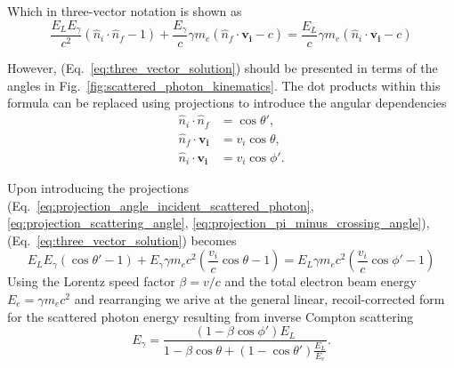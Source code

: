 \documentclass[../main.tex]{subfiles}
\begin{document}
Which in three-vector notation is shown as
\begin{equation}
\frac{E_{L}E_{\gamma}}{c^{2}}\left(\hat{n}_{i}\cdot\hat{n}_{f}-1\right)+\frac{E_{\gamma}}{c}\gamma m_{e}\left(\hat{n}_{f}\cdot \boldsymbol{v_{i}}-c\right) = \frac{E_{L}}{c}\gamma m_{e}\left(\hat{n}_{i}\cdot \boldsymbol{v_{i}} -c\right)
\label{eq:three_vector_solution}
\end{equation}

However, (Eq.~\ref{eq:three_vector_solution}) should be presented in terms of the angles in Fig.~\ref{fig:scattered_photon_kinematics}. The dot products within this formula can be replaced using projections to introduce the angular dependencies
\begin{align}
\hat{n}_{i}\cdot\hat{n}_{f} &= \cos\theta',
\label{eq:projection_angle_incident_scattered_photon}\\
\hat{n}_{f}\cdot \boldsymbol{v_{i}} &= v_{i}\cos\theta,
\label{eq:projection_scattering_angle}\\
\hat{n}_{i}\cdot \boldsymbol{v_{i}} &= v_{i}\cos\phi'.
\label{eq:projection_pi_minus_crossing_angle}
\end{align}

Upon introducing the projections (Eq.~\ref{eq:projection_angle_incident_scattered_photon}, \ref{eq:projection_scattering_angle}, \ref{eq:projection_pi_minus_crossing_angle}), (Eq.~\ref{eq:three_vector_solution}) becomes
\begin{equation}
E_{L}E_{\gamma}\left(\cos\theta'-1\right)+E_{\gamma}\gamma m_{e}c^{2}\left(\frac{v_{i}}{c}\cos\theta-1\right) = E_{L}\gamma m_{e}c^{2}\left( \frac{v_{i}}{c}\cos\phi'-1\right)
\label{eq:three_vector_solution_projections}
\end{equation}
Using the Lorentz speed factor $\beta = v/c$ and the total electron beam energy $E_{e} = \gamma m_{e}c^{2}$ and rearranging we arive at the general linear, recoil-corrected form for the scattered photon energy resulting from inverse Compton scattering 
\begin{equation}
E_{\gamma} = \frac{\left(1-\beta\cos\phi'\right)E_{L}}{1-\beta\cos\theta+\left(1-\cos\theta'\right)\frac{E_{L}}{E_{e}}}. 
\label{eq:scattered_photon_energy}
\end{equation}
  
\end{document}
